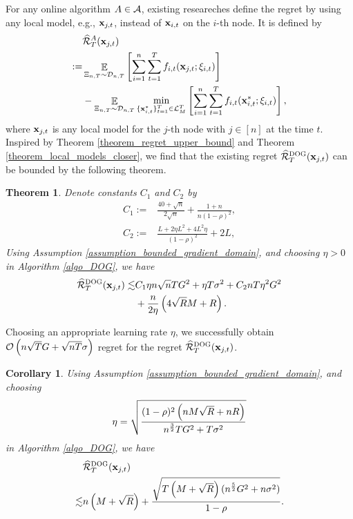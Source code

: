 \documentclass{article}
\def\rc{\color {red}}
\newtheorem{Theorem}{\bf{Theorem}}
\newtheorem{Corollary}{\bf{Corollary}}
\begin{document}
{\rc 
For any online algorithm $A\in{\mathcal{A}}$, existing researeches \citep{pmlr-v70-zhang17g} define the regret by using any local model, e.g., ${\bf x}_{j,t}$, instead of ${\bf x}_{i,t}$ on the $i$-th node. It is defined by 
\begin{align}
\label{equa_define_other_regret}
& \widehat{{\mathcal{R}}}_T^{A}({\bf x}_{j,t}) \\ \nonumber
:= & \mathop{\mathbb{E}}_{\Xi_{n,T} \sim \mathcal{D}_{n,T}}\left [\sum_{i=1}^n \sum_{t=1}^T f_{i,t}({\bf x}_{j,t};\xi_{i,t})\right ] \\ \nonumber
& - \mathop{\mathbb{E}}_{\Xi_{n,T} \sim \mathcal{D}_{n,T}}\min_{\{{\bf x}_{i,t}^\ast\}_{t=1}^T \in {\mathcal{L}}_M^T}\left [\sum_{i=1}^n \sum_{t=1}^T f_{i,t}({\bf x}_{i,t}^\ast;\xi_{i,t})\right ],
\end{align} 
where ${\bf x}_{j,t}$ is any local model for the $j$-th node with $j\in[n]$ at the time $t$. Inspired by Theorem \ref{theorem_regret_upper_bound} and Theorem \ref{theorem_local_models_closer}, we find that the existing regret $\widehat{{\mathcal{R}}}_T^{\textsc{DOG}}({\bf x}_{j,t})$ can be bounded by the following theorem.
\begin{Theorem}
\label{theorem_implied_other_regret_bound}
Denote constants $C_1$ and $C_2$ by
\begin{align}
\nonumber
C_1 := & \frac{40+\sqrt{n}}{2\sqrt{n}} + \frac{1+n}{n(1-\rho)^2}, \\ \nonumber
C_2 := & \frac{L + 2\eta L^2  + 4L^2 \eta}{(1-\rho)^2} +2L,
\end{align}  Using Assumption \ref{assumption_bounded_gradient_domain}, and choosing $\eta>0$ in Algorithm \ref{algo_DOG}, we have
\begin{align}
\nonumber
\widehat{{\mathcal{R}}}_T^{\textsc{DOG}}({\bf x}_{j,t}) \lesssim & C_1 \eta n\sqrt{n} T G^2 +\eta T\sigma^2 + C_2  nT\eta^2 G^2  \\ \nonumber
&  + \frac{n}{2\eta}\left(  4\sqrt{R}M + R   \right).
\end{align}
\end{Theorem} Choosing an appropriate learning rate $\eta$, we successfully obtain ${\mathcal{O}\left( n\sqrt{T}G + \sqrt{nT}\sigma \right)}$ regret for the regret $\widehat{{\mathcal{R}}}_T^{\textsc{DOG}}({\bf x}_{j,t})$.
\begin{Corollary}
\label{corollary_implied_other_regret_bound}
Using Assumption \ref{assumption_bounded_gradient_domain}, and choosing 
\begin{align}
\nonumber
\eta = \sqrt{\frac{(1-\rho)^2 \left( nM\sqrt{R} + nR \right)}{ n^{\frac{3}{2}}TG^2 + T\sigma^2 }}
\end{align} in Algorithm \ref{algo_DOG}, we have
\begin{align}
\nonumber
& \widehat{{\mathcal{R}}}_T^{\textsc{DOG}}({\bf x}_{j,t}) \\ \nonumber
\lesssim & n\left( M+\sqrt{R} \right) + \frac{\sqrt{T\left( M+\sqrt{R} \right)(n^\frac{5}{2}G^2 + n\sigma^2)}}{1-\rho}.
\end{align}
\end{Corollary} 

}
\end{document}
